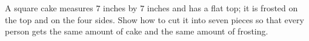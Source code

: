 A square cake measures $7$ inches by $7$ inches and has a flat top; it is frosted on the top and on the four sides. Show how to cut it into seven pieces so that every person gets the same amount of cake and the same amount of frosting.

